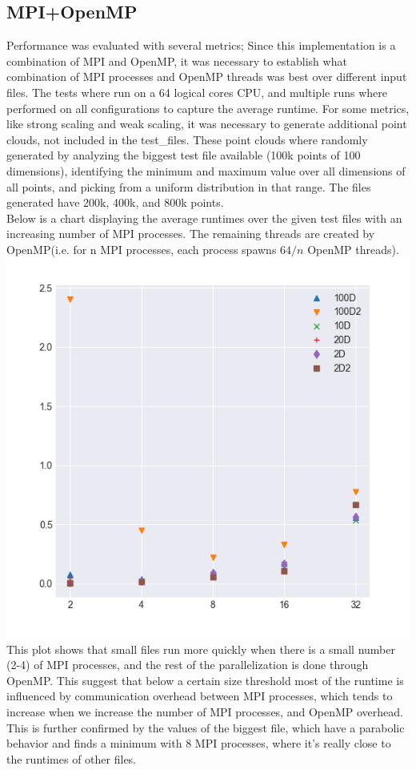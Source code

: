 \documentclass{article}
\begin{document}
\subsection*{MPI+OpenMP}
Performance was evaluated with several metrics; Since this implementation is a combination of MPI and OpenMP, it was necessary to establish what combination of MPI processes and OpenMP threads was best over different input files. The tests where run on a 64 logical cores CPU, and multiple runs where performed on all configurations to capture the average runtime. For some metrics, like strong scaling and weak scaling, it was necessary to generate additional point clouds, not included in the test\_files. These point clouds where randomly generated by analyzing the biggest test file available (100k points of 100 dimensions), identifying the minimum and maximum value over all dimensions of all points, and picking from a uniform distribution in that range. The files generated have 200k, 400k, and 800k points. \\
Below is a chart displaying the average runtimes over the given test files with an increasing number of MPI processes. The remaining threads are created by OpenMP(i.e. for n MPI processes, each process spawns $64/n$ OpenMP threads).\\
\includegraphics[scale=0.40]{png/Average-runtimes-cropped.png}
\\
This plot shows that small files run more quickly when there is a small number (2-4) of MPI processes, and the rest of the parallelization is done through OpenMP. This suggest that below a certain size threshold most of the runtime is influenced by communication overhead between MPI processes, which tends to increase when we increase the number of MPI processes, and OpenMP overhead.\\
This is further confirmed by the values of the biggest file, which have a parabolic behavior and finds a minimum with 8 MPI processes, where it's really close to the runtimes of other files.
\end{document}
